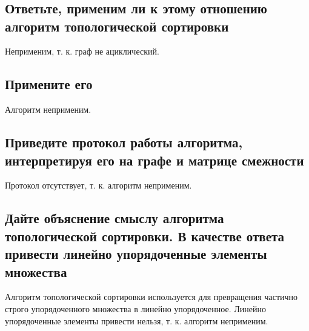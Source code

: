 \vspace{20pt}

{\let\clearpage\relax
    \chapter{}}

\section{Ответьте, применим ли к этому отношению алгоритм топологической сортировки}
Неприменим, т. к. граф не ациклический.
\section{Примените его}
Алгоритм неприменим.
\section{Приведите протокол работы алгоритма, интерпретируя его на графе и матрице смежности}
Протокол отсутствует, т. к. алгоритм неприменим.
\section{Дайте объяснение смыслу алгоритма топологической сортировки. В качестве ответа привести линейно упорядоченные элементы множества}
Алгоритм топологической сортировки используется для превращения частично строго упорядоченного множества в линейно упорядоченное. Линейно упорядоченные элементы привести нельзя, т. к. алгоритм неприменим.

\endinput